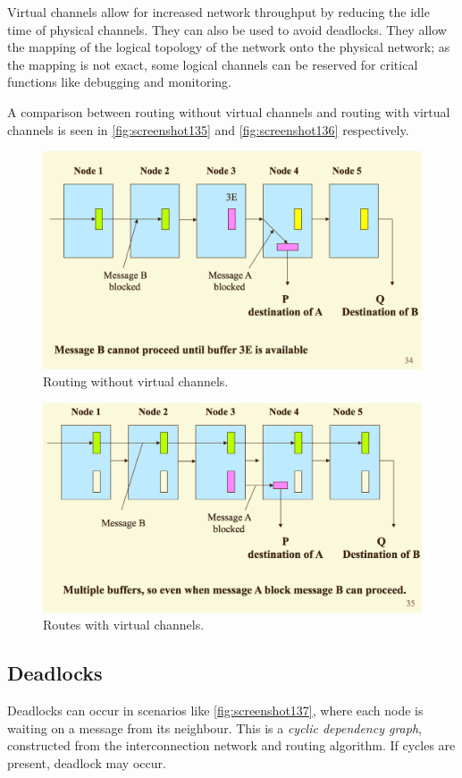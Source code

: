 Virtual channels allow for increased network throughput by reducing the idle time of physical channels. They can also be used to avoid deadlocks. They allow the mapping of the logical topology of the network onto the physical network; as the mapping is not exact, some logical channels can be reserved for critical functions like debugging and monitoring.

A comparison between routing without virtual channels and routing with virtual channels is seen in \autoref{fig:screenshot135} and \autoref{fig:screenshot136} respectively.
\begin{figure}
\centering
\includegraphics[width=0.7\linewidth]{figures/screenshot135}
\caption{Routing without virtual channels.}
\label{fig:screenshot135}
\end{figure}

\begin{figure}
\centering
\includegraphics[width=0.7\linewidth]{figures/screenshot136}
\caption{Routes with virtual channels.}
\label{fig:screenshot136}
\end{figure}

\subsection{Deadlocks}
Deadlocks can occur in scenarios like \autoref{fig:screenshot137}, where each node is waiting on a message from its neighbour. This is a \textit{cyclic dependency graph}, constructed from the interconnection network and routing algorithm. If cycles are present, deadlock may occur.

